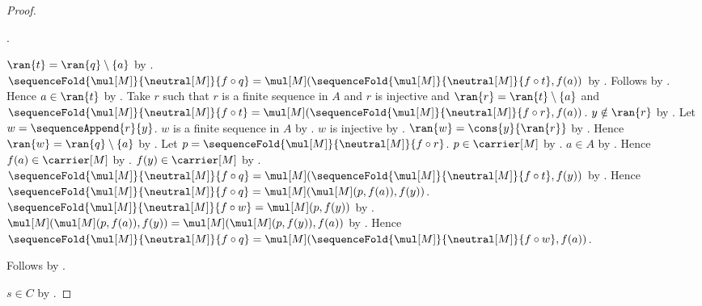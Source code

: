 \begin{proof}
\begin{subproof}
\begin{subproof}
                .
            \begin{byCase}
                $\ran{t}=\ran{q}\setminus\{a\}$ by
                    .
                $\sequenceFold{\mul[M]}{\neutral[M]}{f\circ q}
                    =\mul[M]
                        (\sequenceFold{\mul[M]}{\neutral[M]}{f\circ t},
                         f(a))$ by
                    .
                Follows by \auto.
                Hence $a\in\ran{t}$ by .
                Take $r$ such that
                    $r$ is a finite sequence in $A$ and
                    $r$ is injective and
                    $\ran{r}=\ran{t}\setminus\{a\}$ and
                    $\sequenceFold{\mul[M]}{\neutral[M]}{f\circ t}
                        =\mul[M]
                            (\sequenceFold{\mul[M]}{\neutral[M]}{f\circ r},
                             f(a))$.
                $y\notin\ran{r}$ by .
                Let $w=\sequenceAppend{r}{y}$.
                $w$ is a finite sequence in $A$ by
                    .
                $w$ is injective by
                    .
                $\ran{w}=\cons{y}{\ran{r}}$ by
                    .
                Hence $\ran{w}=\ran{q}\setminus\{a\}$ by
                    .
                Let $p=\sequenceFold{\mul[M]}{\neutral[M]}{f\circ r}$.
                $p\in\carrier[M]$ by
                    .
                $a\in A$ by
                    .
                Hence $f(a)\in\carrier[M]$ by
                    .
                $f(y)\in\carrier[M]$ by .
                $\sequenceFold{\mul[M]}{\neutral[M]}{f\circ q}
                    =\mul[M]
                        (\sequenceFold{\mul[M]}{\neutral[M]}{f\circ t},
                         f(y))$ by
                    .
                Hence
                    $\sequenceFold{\mul[M]}{\neutral[M]}{f\circ q}
                        =\mul[M](\mul[M](p,f(a)),f(y))$.
                $\sequenceFold{\mul[M]}{\neutral[M]}{f\circ w}
                    =\mul[M](p,f(y))$ by
                    .
                $\mul[M](\mul[M](p,f(a)),f(y))
                    =\mul[M](\mul[M](p,f(y)),f(a))$ by
                    .
                Hence
                    $\sequenceFold{\mul[M]}{\neutral[M]}{f\circ q}
                        =\mul[M]
                            (\sequenceFold{\mul[M]}{\neutral[M]}{f\circ w},
                             f(a))$.
            \end{byCase}
        \end{subproof}
        Follows by \auto.
    \end{subproof}
    $s\in C$ by .
\end{proof}

